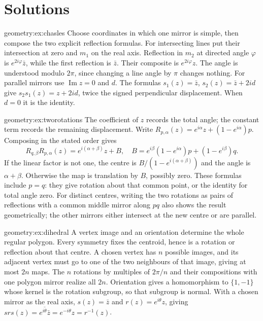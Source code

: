 \section{Solutions}

\begin{solution}{geometry:ex:chasles}
\idea Choose coordinates in which one mirror is simple, then compose the two explicit reflection formulas.
\writeup For intersecting lines put their intersection at zero and $m_1$ on the real axis. Reflection in $m_2$ at directed angle $\varphi$ is $e^{2i\varphi}\bar z$, while the first reflection is $\bar z$. Their composite is $e^{2i\varphi}z$. The angle is understood modulo $2\pi$, since changing a line angle by $\pi$ changes nothing. For parallel mirrors use $\operatorname{Im}z=0$ and $d$. The formulas $s_1(z)=\bar z$, $s_2(z)=\bar z+2id$ give $s_2s_1(z)=z+2id$, twice the signed perpendicular displacement. When $d=0$ it is the identity.
\end{solution}

\begin{solution}{geometry:ex:tworotations}
\idea The coefficient of $z$ records the total angle; the constant term records the remaining displacement.
\writeup Write $R_{p,\alpha}(z)=e^{i\alpha}z+(1-e^{i\alpha})p$. Composing in the stated order gives
\[
R_{q,\beta}R_{p,\alpha}(z)=e^{i(\alpha+\beta)}z+B,
\quad B=e^{i\beta}(1-e^{i\alpha})p+(1-e^{i\beta})q.
\]
If the linear factor is not one, the centre is $B/(1-e^{i(\alpha+\beta)})$ and the angle is $\alpha+\beta$. Otherwise the map is translation by $B$, possibly zero. These formulas include $p=q$: they give rotation about that common point, or the identity for total angle zero. For distinct centres, writing the two rotations as pairs of reflections with a common middle mirror along $pq$ also shows the result geometrically; the other mirrors either intersect at the new centre or are parallel.
\end{solution}

\begin{solution}{geometry:ex:dihedral}
\idea A vertex image and an orientation determine the whole regular polygon.
\writeup Every symmetry fixes the centroid, hence is a rotation or reflection about that centre. A chosen vertex has $n$ possible images, and its adjacent vertex must go to one of the two neighbours of that image, giving at most $2n$ maps. The $n$ rotations by multiples of $2\pi/n$ and their compositions with one polygon mirror realize all $2n$. Orientation gives a homomorphism to $\{1,-1\}$ whose kernel is the rotation subgroup, so that subgroup is normal. With a chosen mirror as the real axis, $s(z)=\bar z$ and $r(z)=e^{i\theta}z$, giving
$srs(z)=\overline{e^{i\theta}\bar z}=e^{-i\theta}z=r^{-1}(z)$.
\end{solution}

